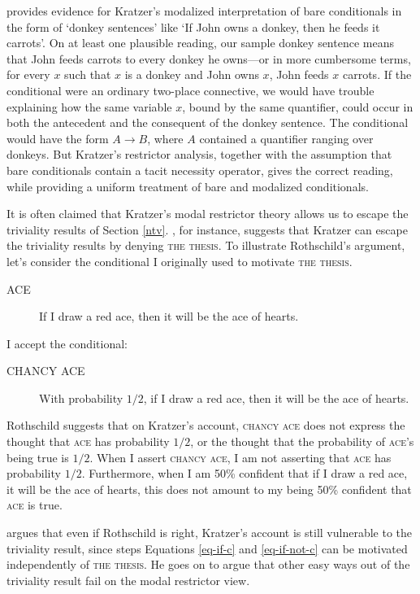 \citet{heim-thesis} provides evidence for Kratzer's modalized interpretation of bare conditionals in the form of `donkey sentences' like `If John owns a donkey, then he feeds it carrots'.  On at least one plausible reading, our sample donkey sentence means that John feeds carrots to every donkey he owns---or in more cumbersome terms, for every $x$ such that $x$ is a donkey and John owns $x$, John feeds $x$ carrots.  If the conditional were an ordinary two-place connective, we would have trouble explaining how the same variable $x$, bound by the same quantifier, could occur in both the antecedent and the consequent of the donkey sentence.  The conditional would have the form $A \rightarrow B$, where $A$ contained a quantifier ranging over donkeys.  But Kratzer's restrictor analysis, together with the assumption that bare conditionals contain a tacit necessity operator, gives the correct reading, while providing a uniform treatment of bare and modalized conditionals.

It is often claimed that Kratzer's modal restrictor theory allows us to escape the triviality results of Section \ref{ntv}. \citet{rothschild-kratzer}, for instance, suggests that Kratzer can escape the triviality results by denying \textsc{the thesis}.  To illustrate Rothschild's argument, let's consider the conditional I originally used to motivate \textsc{the thesis}.
\begin{description}
\item[ACE] If I draw a red ace, then it will be the ace of hearts.
\end{description}
I accept the conditional:
\begin{description}
\item[CHANCY ACE] With probability $1/2$, if I draw a red ace, then it will be the ace of hearts.
\end{description}
Rothschild suggests that on Kratzer's account, \textsc{chancy ace} does not express the thought that \textsc{ace} has probability $1/2$, or the thought that the probability of \textsc{ace}'s being true is $1/2$.  When I assert \textsc{chancy ace}, I am not asserting that \textsc{ace} has probability $1/2$.  Furthermore, when I am 50\% confident that if I draw a red ace, it will be the ace of hearts, this does not amount to my being 50\% confident that \textsc{ace} is true.

 \citet{charlow-trivial} argues that even if Rothschild is right, Kratzer's account is still vulnerable to the triviality result, since steps Equations \ref{eq-if-c} and \ref{eq-if-not-c} can be motivated independently of \textsc{the thesis}.  He goes on to argue that other easy ways out of the triviality result fail on the modal restrictor view.

